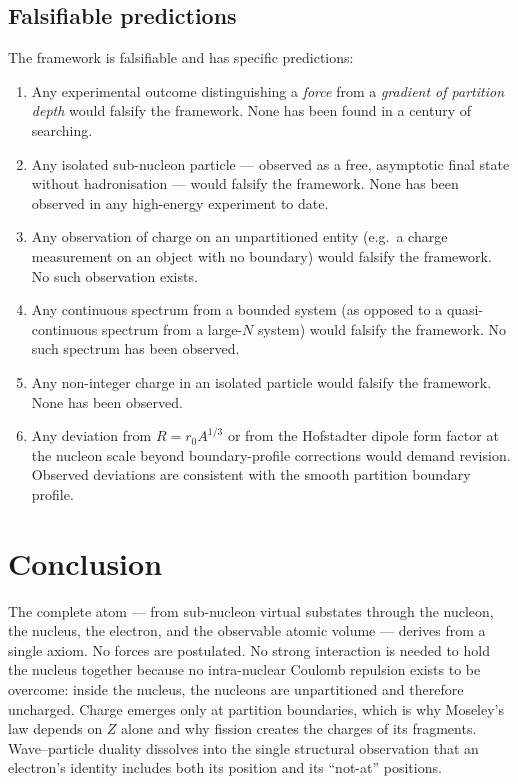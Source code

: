 \documentclass[11pt,a4paper]{article}
\theoremstyle{definition}
\theoremstyle{remark}
\begin{document}
\subsection{Falsifiable predictions}

The framework is falsifiable and has specific predictions:

\begin{enumerate}[leftmargin=2em,itemsep=2pt]
\item Any experimental outcome distinguishing a \emph{force} from a \emph{gradient of partition depth} would falsify the framework. None has been found in a century of searching.
\item Any isolated sub-nucleon particle --- observed as a free, asymptotic final state without hadronisation --- would falsify the framework. None has been observed in any high-energy experiment to date.
\item Any observation of charge on an unpartitioned entity (e.g.\ a charge measurement on an object with no boundary) would falsify the framework. No such observation exists.
\item Any continuous spectrum from a bounded system (as opposed to a quasi-continuous spectrum from a large-$N$ system) would falsify the framework. No such spectrum has been observed.
\item Any non-integer charge in an isolated particle would falsify the framework. None has been observed.
\item Any deviation from $R = r_0 A^{1/3}$ or from the Hofstadter dipole form factor at the nucleon scale beyond boundary-profile corrections would demand revision. Observed deviations are consistent with the smooth partition boundary profile.
\end{enumerate}

\section{Conclusion}
\label{sec:conc}

The complete atom --- from sub-nucleon virtual substates through the nucleon, the nucleus, the electron, and the observable atomic volume --- derives from a single axiom. No forces are postulated. No strong interaction is needed to hold the nucleus together because no intra-nuclear Coulomb repulsion exists to be overcome: inside the nucleus, the nucleons are unpartitioned and therefore uncharged. Charge emerges only at partition boundaries, which is why Moseley's law depends on $Z$ alone and why fission creates the charges of its fragments. Wave--particle duality dissolves into the single structural observation that an electron's identity includes both its position and its ``not-at'' positions.
\end{document}

